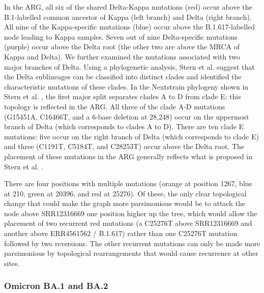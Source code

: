\documentclass[12pt]{article}
\begin{document}
In the ARG, all six of the shared Delta-Kappa mutations (red)
occur above the B.1-labelled common ancestor
of Kappa (left branch) and Delta (right branch).
All nine of the Kappa-specific mutations (blue)
occur above the B.1.617-labelled node leading to Kappa samples.
Seven out of nine Delta-specific mutations (purple)
occur above the Delta root
(the other two are above the MRCA of Kappa and Delta).
We further examined the mutations associated with two major branches of Delta.
Using a phylogenetic analysis, Stern et al.\cite{Stern2021} suggest that
the Delta sublineages can be classified into distinct clades and
identified the characteristic mutations of these clades.
In the Nextstrain phylogeny shown in Stern et al. \cite{Stern2021},
the first major split separates clades A to D from clade E;
this topology is reflected in the ARG.
All three of the clade A-D mutations
(G15451A, C16466T, and a 6-base deletion at 28,248)
occur on the uppermost branch of Delta (which corresponds to clades A to D).
There are ten clade E mutations:
five occur on the right branch of Delta (which corresponds to clade E) and
three (C1191T, C5184T, and C28253T) occur above the Delta root.
The placement of these mutations in the ARG generally reflects
what is proposed in Stern et al. \cite{Stern2021}.

There are four positions with multiple mutations
(orange at position 1267, blue at 210, green at 20396, and red at 25276).
Of these, the only clear topological change
that could make the graph more parsimonious would be
to attach the node above SRR12316669 one position higher up the tree,
which would allow the placement of two recurrent red mutations
(a C25276T above SRR12316669 and another above ERR4561562 / B.1.617)
rather than one C25276T mutation followed by two reversions.
The other recurrent mutations can only be made more parsimonious
by topological rearrangements that would cause recurrence at other sites.


\subsubsection{Omicron BA.1 and BA.2}
\label{sec:dd_omicron}
\end{document}
